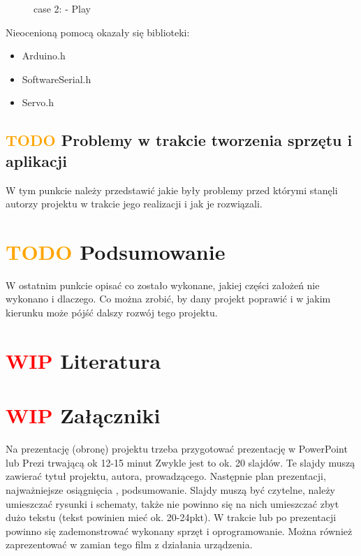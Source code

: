\documentclass[11pt,titlepage,a4paper]{article}
\begin{document}
\begin{figure}[h!]
    
    \caption{case 2: - Play}
    \label{casePlay}
\end{figure}

Nieocenioną pomocą okazały się biblioteki:
\begin{itemize}
    \item Arduino.h \cite{Arduino_lib}
    \item SoftwareSerial.h \cite{EspSoftwareSerial}
    \item Servo.h \cite{EspServo}
\end{itemize}

\subsection{\textcolor{orange}{TODO} Problemy w trakcie tworzenia sprzętu i aplikacji}

W tym punkcie należy przedstawić jakie były problemy przed którymi stanęli autorzy projektu w trakcie jego realizacji i jak je rozwiązali.

\newpage

\section{\textcolor{orange}{TODO} Podsumowanie}

W ostatnim punkcie opisać co zostało wykonane, jakiej części założeń nie wykonano i dlaczego. Co można zrobić, by dany projekt poprawić i w jakim kierunku może pójść dalszy rozwój tego projektu.

\newpage

\section{\textcolor{red}{WIP}  Literatura}

\printbibliography[heading=none]

\newpage

\section{\textcolor{red}{WIP} Załączniki}

Na prezentację (obronę) projektu trzeba przygotować prezentację w PowerPoint lub Prezi trwającą ok 12-15 minut Zwykle jest to ok. 20 slajdów. Te slajdy muszą zawierać tytuł projektu, autora, prowadzącego. Następnie plan prezentacji, najważniejsze osiągnięcia , podsumowanie. Slajdy muszą być czytelne, należy umieszczać rysunki i schematy, także nie powinno się na nich umieszczać zbyt dużo tekstu (tekst powinien mieć ok. 20-24pkt). W trakcie lub po prezentacji powinno się zademonstrować wykonany sprzęt i oprogramowanie. Można również zaprezentować w zamian tego film z działania urządzenia.
\end{document}
